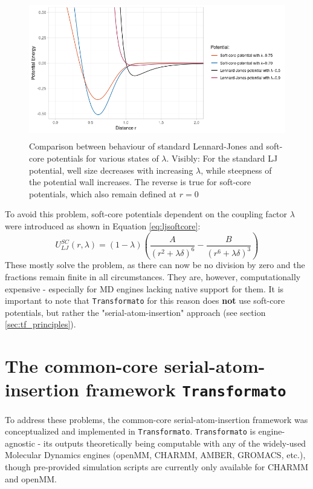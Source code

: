 \documentclass[oneside]{scrreprt}
\begin{document}
\begin{figure}
    \centering
    \includegraphics[height=6cm]{LJandsoftcore.png}
    \caption[Comparision between behaviour of standard LJ potentials vs. soft-core potentials]{Comparison between behaviour of standard Lennard-Jones and soft-core potentials for various states of $\lambda$. Visibly: For the standard LJ potential, well size decreases with increasing $\lambda$, while steepness of the potential wall increases. The reverse is true for soft-core potentials, which also remain defined at $r=0$}
    \label{fig:ljandsoftcore}
\end{figure}

To avoid this problem, soft-core potentials dependent on the coupling factor $\lambda$ were introduced as shown in Equation \ref{eq:ljsoftcore}\cite{Beutler1994Jun}:
\begin{equation}
U_{LJ}^{SC}(r,\lambda)=(1-\lambda)(\frac{A}{(r^2 +\lambda \delta)^6 }-\frac{B}{(r^6 +\lambda \delta)^3})
\label{eq:ljsoftcore}
\end{equation}
These mostly solve the problem, as there can now be no division by zero and the fractions remain finite in all circumstances. They are, however, computationally expensive  - especially for MD engines lacking native support for them\cite{Li2020Aug}. It is important to note that \texttt{Transformato} for this reason does \textbf{not} use soft-core potentials, but rather the "serial-atom-insertion" approach (see section \ref{sec:tf_principles}).


\section{The common-core serial-atom-insertion framework {\texttt{Transformato}}}
To address these problems, the common-core serial-atom-insertion framework was conceptualized and implemented in \texttt{Transformato}. \texttt{Transformato} is engine-agnostic - its outputs theoretically being computable with any of the widely-used Molecular Dynamics engines (openMM, CHARMM, AMBER, GROMACS, etc.), though pre-provided simulation scripts are currently only available for CHARMM and openMM.
\end{document}
